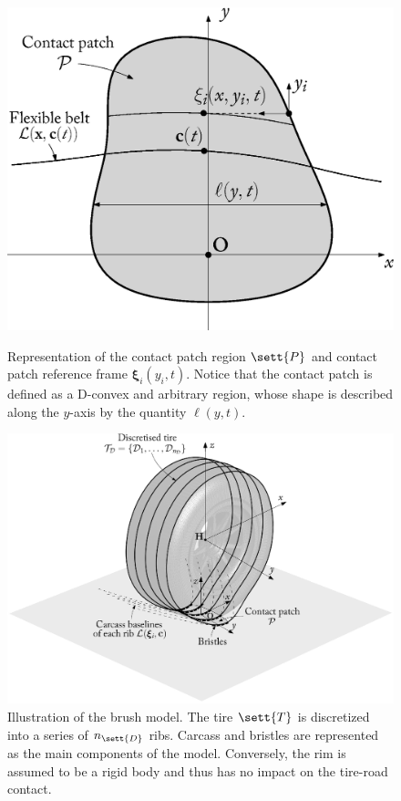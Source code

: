 \begin{figure}[htb]
  \centering
  \begin{minipage}[t]{0.475\linewidth}
    \centering
    \includegraphics[width=0.9\linewidth]{figures/appendix_3/contact_patch_vertical}
    \caption{Representation of the contact patch region $\sett{P}$ and contact patch reference frame $\bm{\xi}_i(y_i,t)$. Notice that the contact patch is defined as a D-convex and arbitrary region, whose shape is described along the $y$-axis by the quantity $\ell(y,t)$.}
    \label{app3:fig:contact_patch_vertical}
  \end{minipage}
  \hfill
  \begin{minipage}[t]{0.475\linewidth}
    \centering
    \includegraphics[width=0.9\linewidth, trim={4.35cm 3cm 4.35cm 0cm}, clip]{figures/appendix_3/brush_model}
    \caption{Illustration of the brush model. The tire $\sett{T}$ is discretized into a series of $n_\sett{D}$ ribs. Carcass and bristles are represented as the main components of the model. Conversely, the rim is assumed to be a rigid body and thus has no impact on the tire-road contact.}
    \label{app3:fig:brush_model}
  \end{minipage}
\end{figure}

